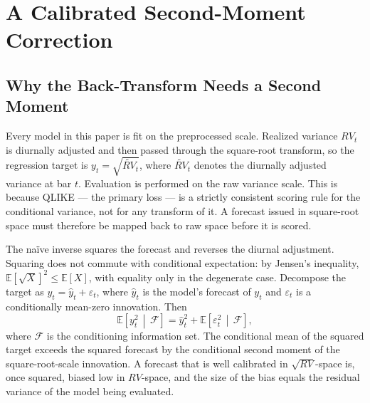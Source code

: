 \section{A Calibrated Second-Moment Correction}
\label{sec:smearing}

%

\subsection{Why the Back-Transform Needs a Second Moment}
\label{sec:smearing_bias}

Every model in this paper is fit on the preprocessed scale. Realized variance
$RV_t$ is diurnally adjusted and then passed through the square-root
transform, so the regression target is $y_t = \sqrt{\widetilde{RV}_t}$, where
$\widetilde{RV}_t$ denotes the diurnally adjusted variance at bar $t$.
Evaluation is performed on the raw variance scale. This is because QLIKE ---
the primary loss --- is a strictly consistent scoring rule for the
conditional variance, not for any transform of it. A forecast issued in
square-root space must therefore be mapped back to raw space before it is
scored.

The na\"ive inverse squares the forecast and reverses the diurnal
adjustment. Squaring does not commute with conditional expectation: by
Jensen's inequality, $\mathbb{E}[\sqrt{X}]^2 \le \mathbb{E}[X]$, with
equality only in the degenerate case. Decompose the target as
$y_{t} = \hat{y}_{t} + \varepsilon_{t}$, where $\hat{y}_t$ is the model's
forecast of $y_t$ and $\varepsilon_t$ is a conditionally mean-zero
innovation. Then
\begin{equation}
    \mathbb{E}\!\left[y_t^2 \,\middle|\, \mathcal{F}\right]
    = \hat{y}_t^2 + \mathbb{E}\!\left[\varepsilon_t^2 \,\middle|\, \mathcal{F}\right],
    \label{eq:second_moment}
\end{equation}
where $\mathcal{F}$ is the conditioning information set. The conditional mean
of the squared target exceeds the squared forecast by the conditional second
moment of the square-root-scale innovation. A forecast that is well
calibrated in $\sqrt{RV}$-space is, once squared, biased low in $RV$-space,
and the size of the bias equals the residual variance of the model being
evaluated.

